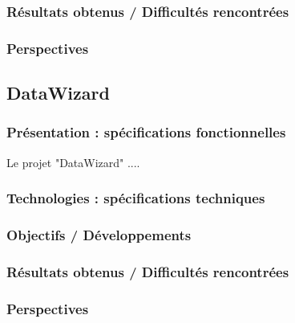 \subsubsection{Résultats obtenus / Difficultés rencontrées}

\subsubsection{Perspectives}


\subsection{DataWizard}

\subsubsection{Présentation : spécifications fonctionnelles}

Le projet "DataWizard" ....\\

\subsubsection{Technologies : spécifications techniques}


\subsubsection{Objectifs / Développements}


\subsubsection{Résultats obtenus / Difficultés rencontrées}


\subsubsection{Perspectives}

